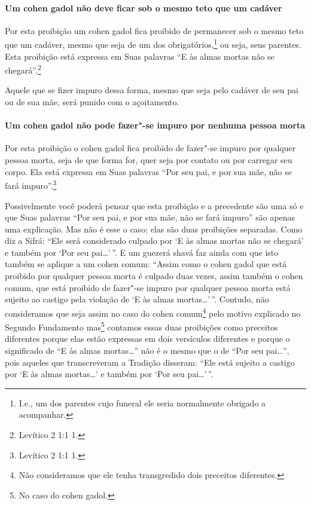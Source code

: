 \begin{multicols}{2}
\paragraph{Um cohen gadol\starr{} não deve ficar sob o mesmo teto que um cadáver}

Por esta proibição um cohen gadol\starr{} fica proibido de permanecer sob o
mesmo teto que um cadáver, mesmo que seja de um dos
obrigatórios,\footnote{I.e., um dos parentes cujo funeral ele seria normalmente obrigado a acompanhar.} ou seja, seus parentes. Esta
proibição está expressa em Suas palavras ``E às almas mortas não se
chegará''.\footnote{Levítico 2 1:1 1.}

Aquele que se fizer impuro dessa forma, mesmo que seja pelo cadáver de
seu pai ou de sua mãe, será punido com o açoitamento.

\paragraph{Um cohen gadol\starr{} não pode fazer"-se impuro por nenhuma pessoa morta}

Por esta proibição o cohen gadol\starr{} fica proibido de fazer"-se impuro
por qualquer pessoa morta, seja de que forma for, quer seja por contato
ou por carregar seu corpo. Ela está expressa em Suas palavras ``Por seu
pai, e por sua mãe, não se fará impuro''.\footnote{Levítico 2 1:1 1.}

Possivelmente você poderá pensar que esta proibição e a precedente são
uma só e que Suas palavras ``Por seu pai, e por sua mãe, não se fará
impuro'' são apenas uma explicação. Mas não é esse o caso: elas são
duas proibições separadas. Como diz a Sifrá\starr: ``Ele será considerado
culpado por `E às almas mortas não se chegará' e também por `Por seu
pai\ldots{}'\,''. E um guezerá shavá\starr{} faz ainda com
que isto também se aplique a um cohen\starr{} comum: ``Assim como o cohen
gadol\starr{} que está proibido por qualquer pessoa morta é culpado duas vezes,
assim também o cohen\starr{} comum, que está proibido de fazer"-se impuro por
qualquer pessoa morta está sujeito ao castigo pela violação de `E às
almas mortas\ldots{}'\,''. Contudo, não consideramos que seja assim no caso do
cohen\starr{} comum\footnote{Não consideramos que ele tenha transgredido dois preceitos
  diferentes.} pelo motivo explicado no Segundo
Fundamento mas\footnote{No caso do cohen gadol\starr.} contamos essas duas proibições
como preceitos diferentes porque elas estão expressas em dois
versículos diferentes e porque o significado de ``E às almas
mortas\ldots{}'' não é o mesmo que o de ``Por seu pai\ldots{}'', pois aqueles que
transcreveram a Tradição disseram: ``Ele está sujeito a castigo por `E
às almas mortas\ldots{}' e também por `Por seu pai\ldots{}'\,''.


\end{multicols}
